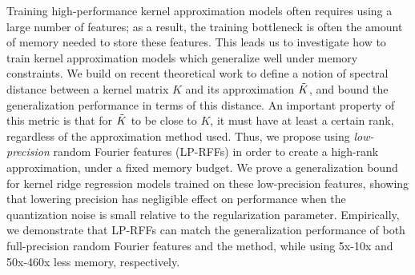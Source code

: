 
Training high-performance kernel approximation models often requires using a large number of features; as a result, the training bottleneck is often the amount of memory needed to store these features. This leads us to investigate how to train kernel approximation models which generalize well under memory constraints. We build on recent theoretical work \citep{avron17,musco17} to define a notion of spectral distance between a kernel matrix $K$ and its approximation $\tilde{K}$, and bound the generalization performance in terms of this distance. An important property of this metric is that for $\tilde{K}$ to be close to $K$, it must have at least a certain rank, regardless of the approximation method used. Thus, we propose using \emph{low-precision} random Fourier features (LP-RFFs) in order to create a high-rank approximation, under a fixed memory budget. We prove a generalization bound for kernel ridge regression models trained on these low-precision features, showing that lowering precision has negligible effect on performance when the quantization noise is small relative to the regularization parameter. Empirically, we demonstrate that LP-RFFs can match the generalization performance of both full-precision random Fourier features and the \Nystrom method, while using 5x-10x and 50x-460x less memory, respectively.


